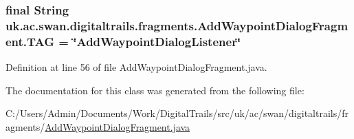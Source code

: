 \hypertarget{classuk_1_1ac_1_1swan_1_1digitaltrails_1_1fragments_1_1_add_waypoint_dialog_fragment_aa145770d7c02b78f466481179a257242}{
\subsubsection[{T\+A\+G}]{\setlength{\rightskip}{0pt plus 5cm}final String uk.\+ac.\+swan.\+digitaltrails.\+fragments.\+Add\+Waypoint\+Dialog\+Fragment.\+T\+A\+G = \char`\"{}Add\+Waypoint\+Dialog\+Listener\char`\"{}\hspace{0.3cm}{\ttfamily [static]}}}\label{classuk_1_1ac_1_1swan_1_1digitaltrails_1_1fragments_1_1_add_waypoint_dialog_fragment_aa145770d7c02b78f466481179a257242}


Definition at line 56 of file Add\+Waypoint\+Dialog\+Fragment.\+java.



The documentation for this class was generated from the following file\+:\begin{DoxyCompactItemize}
\item 
C\+:/\+Users/\+Admin/\+Documents/\+Work/\+Digital\+Trails/src/uk/ac/swan/digitaltrails/fragments/\hyperlink{_add_waypoint_dialog_fragment_8java}{Add\+Waypoint\+Dialog\+Fragment.\+java}\end{DoxyCompactItemize}
